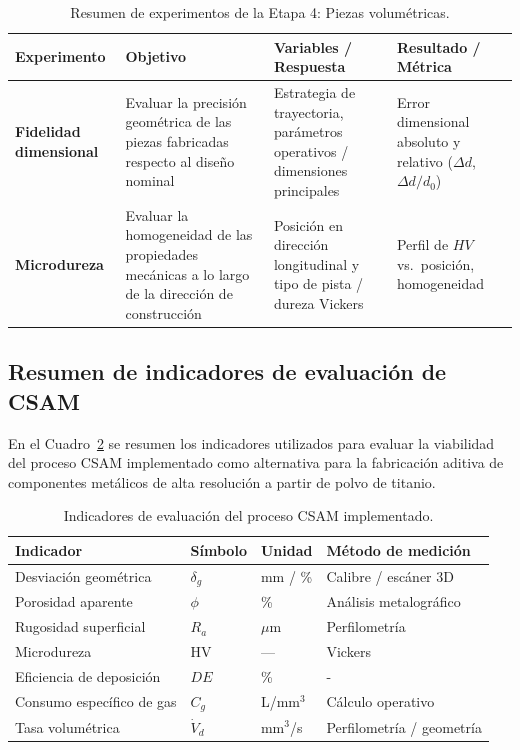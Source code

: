 \begin{table}[htbp]
	\centering
	\caption[Resumen de experimentos de la Etapa 4: Piezas volumétricas]{Resumen de experimentos de la Etapa 4: Piezas volumétricas.}
	\label{tab:resumen_etapa4}
		\footnotesize
	\renewcommand{\arraystretch}{1.5}
	\begin{tabular}{>{\bfseries}p{} p{} p{} p{}}
		\toprule
		Experimento & Objetivo & Variables / Respuesta & Resultado / Métrica \\
		\midrule
		Fidelidad dimensional &
		Evaluar la precisión geométrica de las piezas fabricadas respecto al diseño nominal &
		Estrategia de trayectoria, parámetros operativos / dimensiones principales &
		Error dimensional absoluto y relativo ($\Delta d$, $\Delta d / d_0$) \\
		\midrule
		Microdureza &
		Evaluar la homogeneidad de las propiedades mecánicas a lo largo de la dirección de construcción &
		Posición en dirección longitudinal y tipo de pista / dureza Vickers &
		Perfil de $HV$ vs.\ posición, homogeneidad \\
		\bottomrule
	\end{tabular}
\end{table}

\subsection{Resumen de indicadores de evaluación de CSAM}

En el Cuadro~\ref{tab:indicadores} se resumen los indicadores utilizados para evaluar la viabilidad del proceso CSAM implementado como alternativa para la fabricación aditiva de componentes metálicos de alta resolución a partir de polvo de titanio.

\begin{table}[h]
	\centering
	\caption[Indicadores de evaluación del proceso CSAM implementado]{Indicadores de evaluación del proceso CSAM implementado.}
	\label{tab:indicadores}
	\footnotesize
	\begin{tabular}{llll}
		\hline
		Indicador & Símbolo & Unidad & Método de medición \\
		\hline
		Desviación geométrica        & $\delta_g$      & mm / \%        & Calibre / escáner 3D \\
		Porosidad aparente           & $\phi$          & \%             & Análisis metalográfico \\
		Rugosidad superficial        & $R_a$           & $\mu$m         & Perfilometría \\
		Microdureza                  & HV              & —              & Vickers \\
		Eficiencia de deposición     & $DE$        & \%             & - \\
		Consumo específico de gas    & $C_g$           & L/mm$^3$       & Cálculo operativo \\
		Tasa volumétrica             & $\dot{V}_d$     & mm$^3$/s       & Perfilometría / geometría \\
		\hline
	\end{tabular}
\end{table}
